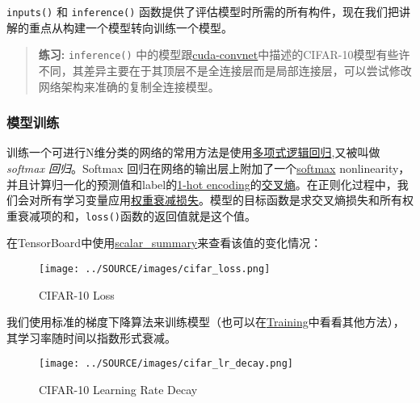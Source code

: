 \lstinline{inputs()} 和 \lstinline{inference()}
函数提供了评估模型时所需的所有构件，现在我们把讲解的重点从构建一个模型转向训练一个模型。

\begin{quote}
\textbf{练习:} \lstinline{inference()}
中的模型跟\href{https://code.google.com/p/cuda-convnet/}{cuda-convnet}中描述的CIFAR-10模型有些许不同，其差异主要在于其顶层不是全连接层而是局部连接层，可以尝试修改网络架构来准确的复制全连接模型。
\end{quote}

\subsubsection{模型训练}\label{ux6a21ux578bux8badux7ec3}

训练一个可进行N维分类的网络的常用方法是使用\href{https://en.wikipedia.org/wiki/Multinomial_logistic_regression}{多项式逻辑回归},又被叫做\emph{softmax
回归}。Softmax
回归在网络的输出层上附加了一个\href{https://github.com/jikexueyuanwiki/tensorflow-zh/blob/master/SOURCE/api_docs/python/nn.md\#softmax}{softmax}
nonlinearity，并且计算归一化的预测值和label的\href{https://github.com/jikexueyuanwiki/tensorflow-zh/blob/master/SOURCE/api_docs/python/sparse_ops.md\#sparse_to_dense}{1-hot
encoding}的\href{https://github.com/jikexueyuanwiki/tensorflow-zh/blob/master/SOURCE/api_docs/python/nn.md\#softmax_cross_entropy_with_logits}{交叉熵}。在正则化过程中，我们会对所有学习变量应用\href{https://github.com/jikexueyuanwiki/tensorflow-zh/blob/master/SOURCE/api_docs/python/nn.md\#l2_loss}{权重衰减损失}。模型的目标函数是求交叉熵损失和所有权重衰减项的和，\lstinline{loss()}函数的返回值就是这个值。

在TensorBoard中使用\href{https://github.com/jikexueyuanwiki/tensorflow-zh/blob/master/SOURCE/api_docs/python/train.md\#scalar_summary}{scalar\_summary}来查看该值的变化情况：

\begin{figure}[htbp]
\centering
\texttt{[image: ../SOURCE/images/cifar\_loss.png]}
\caption{CIFAR-10 Loss}
\end{figure}

我们使用标准的梯度下降算法来训练模型（也可以在\href{https://github.com/jikexueyuanwiki/tensorflow-zh/blob/master/SOURCE/api_docs/python/train.md}{Training}中看看其他方法），其学习率随时间以指数形式衰减。

\begin{figure}[htbp]
\centering
\texttt{[image: ../SOURCE/images/cifar\_lr\_decay.png]}
\caption{CIFAR-10 Learning Rate Decay}
\end{figure}

